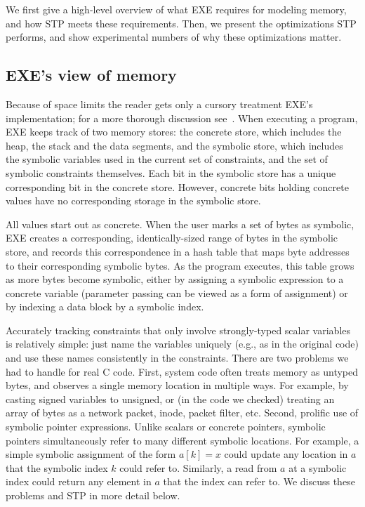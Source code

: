 \documentclass[11pt]{article}
\begin{document}
We first give a high-level overview of what EXE requires for modeling
memory, and how STP meets these requirements.  Then, we present the
optimizations STP performs, and show experimental numbers of why these
optimizations matter.

\subsection{EXE's view of memory}

Because of space limits the reader gets only a cursory treatment EXE's
implementation; for a more thorough discussion see~\cite{exe:disks}.
When executing a program, EXE keeps track of two memory stores: the
concrete store, which includes the heap, the stack and the data
segments, and the symbolic store, which includes the symbolic
variables used in the current set of constraints, and the set of
symbolic constraints themselves. Each bit in the symbolic store has a
unique corresponding bit in the concrete store.  However, concrete
bits holding concrete values have no corresponding storage in the
symbolic store.

All values start out as concrete.  When the user marks a set of bytes
as symbolic, EXE creates a corresponding, identically-sized range of
bytes in the symbolic store, and records this correspondence in a hash
table that maps byte addresses to their corresponding symbolic bytes.
As the program executes, this table grows as more bytes become
symbolic, either by assigning a symbolic expression to a concrete
variable (parameter passing can be viewed as a form of assignment) or
by indexing a data block by a symbolic index.

Accurately tracking constraints that only involve strongly-typed
scalar variables is relatively simple: just name the variables uniquely
(e.g., as in the original code) and use these names consistently in the
constraints.  There are two problems we had to handle for real C code.
First, system code often treats memory as untyped bytes, and observes
a single memory location in multiple ways.
For example, by casting signed
variables to unsigned, or (in the code we checked) treating an array
of bytes as a network packet, inode, packet filter, etc. 
Second, prolific use of symbolic pointer expressions.  Unlike scalars or
concrete pointers, symbolic pointers simultaneously refer to many different
symbolic locations.  For example, a simple symbolic assignment of the form
$a[k] = x$ could update any location in $a$ that the symbolic index $k$
could refer to.  Similarly, a read from $a$ at a symbolic index could
return any element in $a$ that the index can refer to. 
We discuss these problems and STP in more detail below.
\end{document}
